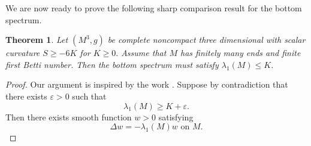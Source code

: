 \documentclass{amsart}
\newtheorem{theorem}{Theorem}[section]
\numberwithin{equation}{section}
\begin{document}
We are now ready to prove the following sharp comparison result for the bottom spectrum. 

\begin{theorem}
Let $\left( M^{3},g\right) $ be complete noncompact three dimensional with
scalar curvature $S\geq -6K$ for $K\geq 0.$ Assume that $M$ has finitely
many ends and finite first Betti number. Then the bottom spectrum must satisfy
$\lambda _{1}\left( M\right)\leq K.$
\end{theorem}

\begin{proof}
Our argument is inspired by the work \cite{APX, HKKZ}.
Suppose by contradiction that there exists $\varepsilon >0$ such that 
\begin{equation}
\lambda _{1}\left( M\right) \geq K+\varepsilon.  \label{a0}
\end{equation}
Then there exists smooth function $w>0$ satisfying
\begin{equation}
\Delta w=-\lambda _{1}\left( M\right) w\text{ \ on \ }M.  \label{w}
\end{equation}


\end{proof}
\end{document}
